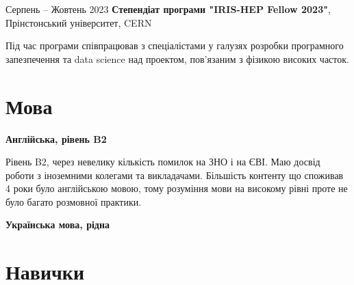 \documentclass[10pt, letterpaper]{article}
\begin{document}
        
        \begin{twocolentry}{
            Серпень – Жовтень 2023
        }
            \textbf{Степендіат програми "IRIS-HEP Fellow 2023"}, Прінстонський університет, CERN \end{twocolentry}

        \vspace{0.10 cm}
        \begin{onecolentry}
            Під час програми співпрацював з спеціалістами у галузях розробки програмного запезпечення та data science над проектом, пов'язаним з фізикою високих часток.
        \end{onecolentry}

    \section{Мова}
        

        \begin{samepage}
            \textbf{Англійська, рівень B2}


            Рівень B2, через невелику кількість помилок на ЗНО і на ЄВІ. Маю досвід роботи з іноземними колегами та викладачами. Більшість контенту що споживав 4 роки було англійською мовою, тому розуміння мови на високому рівні проте не було багато розмовної практики.


            \textbf{Українська мова, рідна}

        \end{samepage}

    \section{Навички}
\end{document}
